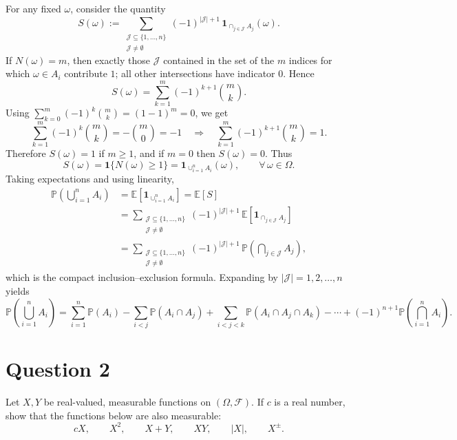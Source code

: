 \documentclass[letterpaper]{article}
\begin{document}
			For any fixed $\omega$, consider the quantity
			\[
			S(\omega):=
			\sum_{\substack{\mathcal{J}\subseteq\{1,\dots,n\}\\ \mathcal{J}\neq\emptyset}}
			(-1)^{|\mathcal{J}|+1}\,
			\mathbf{1}_{\cap_{j\in\mathcal{J}}A_j}(\omega).
			\]
			If $N(\omega)=m$, then exactly those $\mathcal{J}$ contained in the set of the
			$m$ indices for which $\omega\in A_i$ contribute $1$; all other intersections have
			indicator $0$. Hence
			\[
			S(\omega)=\sum_{k=1}^m (-1)^{k+1}\binom{m}{k}.
			\]
			Using $\sum_{k=0}^m (-1)^k\binom{m}{k}=(1-1)^m=0$, we get
			\[
			\sum_{k=1}^m (-1)^k\binom{m}{k}=-\binom{m}{0}=-1
			\quad\Longrightarrow\quad
			\sum_{k=1}^m (-1)^{k+1}\binom{m}{k}=1.
			\]
			Therefore $S(\omega)=1$ if $m\ge 1$, and if $m=0$ then $S(\omega)=0$. Thus
			\[
			S(\omega)=\mathbf{1}\{N(\omega)\ge 1\}=\mathbf{1}_{\cup_{i=1}^n A_i}(\omega),
			\qquad \forall\,\omega\in\Omega.
			\]
			Taking expectations and using linearity,
			\begin{align*}
				\mathbb{P}\!\left(\bigcup_{i=1}^n A_i\right)
				&=\mathbb{E}\left[\mathbf{1}_{\cup_{i=1}^n A_i}\right]
				=\mathbb{E}[S]\\
				&=
				\sum_{\substack{\mathcal{J}\subseteq\{1,\dots,n\}\\ \mathcal{J}\neq\emptyset}}
				(-1)^{|\mathcal{J}|+1}\,
				\mathbb{E}\!\left[\mathbf{1}_{\cap_{j\in\mathcal{J}}A_j}\right]\\
				&=
				\sum_{\substack{\mathcal{J}\subseteq\{1,\dots,n\}\\ \mathcal{J} \neq \emptyset}}
				(-1)^{|\mathcal{J}|+1}\,
				\mathbb{P}\!\left(\bigcap_{j\in\mathcal{J}}A_j\right),
			\end{align*}
			which is the compact inclusion--exclusion formula. Expanding by $|\mathcal{J}|=1,2,\dots,n$
			yields
			\[
			\mathbb{P}\!\left( \bigcup_{i=1}^n A_i \right)
			= \sum_{i=1}^n \mathbb{P}(A_i)
			- \sum_{i<j} \mathbb{P}(A_i \cap A_j)
			+ \sum_{i<j<k} \mathbb{P}(A_i \cap A_j \cap A_k)
			- \cdots
			+ (-1)^{n+1}\mathbb{P}\!\left(\bigcap_{i=1}^n A_i\right).
			\]

		
		
		\clearpage
		
	
	\section{Question 2}
	
	Let $X,Y$ be real-valued, measurable functions on $(\Omega,\mathcal{F})$.
	If $c$ is a real number, show that the functions below are also measurable:
	\[
	cX, \qquad X^2, \qquad X+Y, \qquad XY, \qquad |X|, \qquad X^{\pm}.
	\]
		
\end{document}
